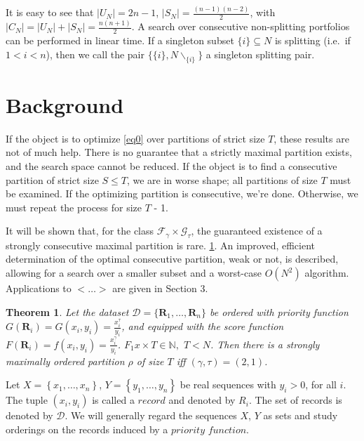 \documentclass{article}
\newtheorem{thm}{Theorem}
\theoremstyle{case}
\begin{document}
It is easy to see that $| U_N | = 2n - 1$, $| S_N | = \frac{(n-1)(n-2)}{2}$, with $|C_N| = |U_N| + |S_N| = \frac{n(n+1)}{2}$. A search over consecutive non-splitting portfolios can be performed in linear time. If a singleton subset $\{ i \} \subseteq N$ is splitting (i.e.\ if $1 < i < n$), then we call the pair $\{ \{i\}, N\backslash_{\{i\}} \}$ a singleton splitting pair.
\section{Background}

If the object is to optimize \eqref{eq0} over partitions of strict size $T$, these results are not of much help. There is no guarantee that a strictly maximal partition exists, and the search space cannot be reduced. If the object is to find a consecutive partition of strict size $S \le T$, we are in worse shape; all partitions of size $T$ must be examined. If the optimizing partition is consecutive, we're done. Otherwise, we must repeat the process for size $T$ - 1. 

\vspace{4pt}

It will be shown that, for the class $\mathcal{F}_{\gamma} \times \mathcal{G}_{\tau}$, the guaranteed existence of a strongly consecutive maximal partition is rare. \ref{thm0}. An improved, efficient determination of the optimal consecutive partition, weak or not, is described, allowing for a search over a smaller subset and a worst-case $O(N^2)$ algorithm. Applications to $<\dots>$ are given in Section 3.

\begin{thm} \label{thm0}
Let the dataset $\mathcal{D} = \{ \mathbf{R}_1, \ldots, \mathbf{R}_n \}$ be ordered with priority function $G(\mathbf{R}_i) = G(x_i,y_i) =  \frac{x_i^\tau}{y_i}$, and equipped with the score function $F(\mathbf{R}_i) = f(x_i,y_i) = \frac{x_i^\gamma}{y_i}$. $F_1x \times T \in \mathbb{N},$ $T < N$. Then there is a strongly maximally ordered partition $\rho$ of size $T$ iff $(\gamma, \tau) = (2,1)$.
\end{thm}

Let $X = \left\lbrace x_1, \dots, x_n\right\rbrace$, $Y = \left\lbrace y_1, \dots, y_n\right\rbrace$ be real sequences with $y_i > 0$, for all $i$. The tuple $\left(x_i, y_i\right)$ is called a $\textit{record}$ and denoted by $R_i$. The set of records is denoted by $\mathcal{D}$. We will generally regard the sequences $X$, $Y$ as sets and study orderings on the records induced by a $\textit{priority function}$.
\end{document}

